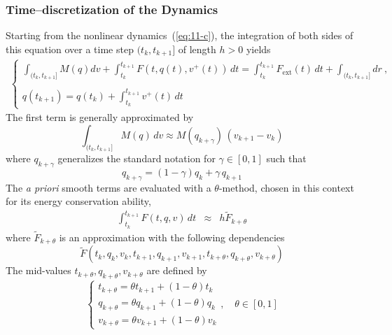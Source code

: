 \subsubsection{Time--discretization of the Dynamics}
Starting from the nonlinear dynamics~(\ref{eq:11-c}), the integration of  both sides of this equation over a time step $(t_k,t_{k+1}]$ of length $h>0$ yields\begin{eqnarray}
  \begin{cases}
    \displaystyle \int_{(t_k,t_{k+1}]} M(q) dv + \int_{t_k}^{t_{k+1}} F(t, q(t), v^+(t)) \,dt = \displaystyle \int_{t_k}^{t_{k+1}} F_{\mathrm{ext}}(t)\,dt +
        \displaystyle \int_{(t_k,t_{k+1}]} dr \:, \\ \\
     q(t_{k+1}) = q(t_{k}) + \displaystyle \int_{t_k}^{t_{k+1}} v^+(t)\,dt 
   \end{cases}
\end{eqnarray}
The first term is generally approximated by
\begin{equation}
\label{eq:19-NL}
  \displaystyle \int_{(t_k,t_{k+1}]} M(q) \,dv \approx  M(q_{k+\gamma})\,(v_{k+1}-v_{k}) 
\end{equation}
where $q_{k+\gamma}$ generalizes the standard notation for $\gamma \in [0,1]$ such that
\begin{equation}
  \label{eq:NL1}
  q_{k+\gamma} = (1-\gamma) q_{k} + \gamma\,  q_{k+1}
\end{equation}
The \textit{a priori} smooth terms are evaluated with a $\theta$-method, chosen in this context for its energy conservation ability,
\begin{eqnarray}
  \displaystyle \int_{t_k}^{t_{k+1}} F(t,q,v) \,dt  &\approx& 
  h  \tilde F_{k+\theta} 
\end{eqnarray}
where $\tilde F_{k+\theta}$ is an approximation with the following dependencies
$$ \tilde F(t_k,q_k,v_k,t_{k+1},q_{k+1},v_{k+1},t_{k+\theta},q_{k+\theta},v_{k+\theta}) $$
The mid-values $t_{k+\theta},q_{k+\theta},v_{k+\theta}$ are defined by
\begin{equation}
  \label{eq:NSCD-discret-b}
  \left\{\begin{array}{l}
  t_{k+\theta} = \theta t_{k+1}+(1-\theta) t_{k}\\
  q_{k+\theta} = \theta q_{k+1}+(1-\theta) q_{k}\\
  v_{k+\theta} = \theta v_{k+1}+(1-\theta) v_{k}
  \end{array}\right.,\quad  \theta \in [0,1]
\end{equation}


